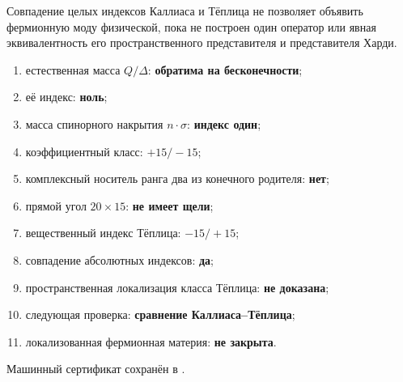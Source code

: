 \begin{nogocriterion}
Совпадение целых индексов Каллиаса и Тёплица не позволяет объявить
фермионную моду физической, пока не построен один оператор или явная
эквивалентность его пространственного представителя и представителя Харди.
\end{nogocriterion}

\begin{protocol}
\begin{enumerate}
 \item естественная масса $Q/\Delta$: \textbf{обратима на бесконечности};
 \item её индекс: \textbf{ноль};
 \item масса спинорного накрытия $n\cdot\sigma$: \textbf{индекс один};
 \item коэффициентный класс: \textbf{$+15/-15$};
 \item комплексный носитель ранга два из конечного родителя: \textbf{нет};
 \item прямой угол $20\times15$: \textbf{не имеет щели};
 \item вещественный индекс Тёплица: \textbf{$-15/+15$};
 \item совпадение абсолютных индексов: \textbf{да};
 \item пространственная локализация класса Тёплица: \textbf{не доказана};
 \item следующая проверка: \textbf{сравнение Каллиаса--Тёплица};
 \item локализованная фермионная материя: \textbf{не закрыта}.
\end{enumerate}
\end{protocol}

Машинный сертификат сохранён в
.